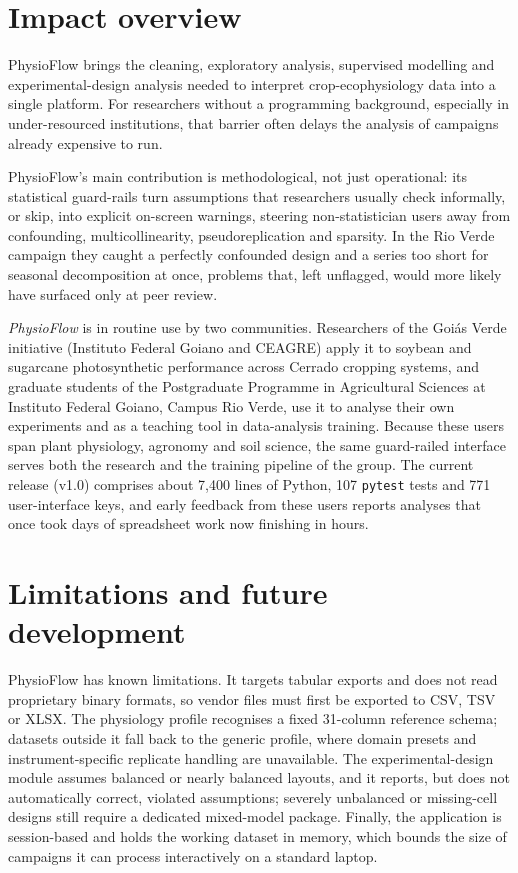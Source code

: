 \documentclass[11pt, letterpaper]{article}
\begin{document}
\section{Impact overview}\label{sec:impact}

PhysioFlow brings the cleaning, exploratory analysis, supervised modelling and experimental-design analysis needed to interpret crop-ecophysiology data into a single platform. For researchers without a programming background, especially in under-resourced institutions, that barrier often delays the analysis of campaigns already expensive to run.

PhysioFlow's main contribution is methodological, not just operational: its statistical guard-rails turn assumptions that researchers usually check informally, or skip, into explicit on-screen warnings, steering non-statistician users away from confounding, multicollinearity, pseudoreplication and sparsity. In the Rio Verde campaign they caught a perfectly confounded design and a series too short for seasonal decomposition at once, problems that, left unflagged, would more likely have surfaced only at peer review.

\emph{PhysioFlow} is in routine use by two communities. Researchers of the Goi\'as Verde initiative (Instituto Federal Goiano and CEAGRE) apply it to soybean and sugarcane photosynthetic performance across Cerrado cropping systems, and graduate students of the Postgraduate Programme in Agricultural Sciences at Instituto Federal Goiano, Campus Rio Verde, use it to analyse their own experiments and as a teaching tool in data-analysis training. Because these users span plant physiology, agronomy and soil science, the same guard-railed interface serves both the research and the training pipeline of the group. The current release (v1.0) comprises about 7{,}400 lines of Python, 107 \texttt{pytest} tests and 771 user-interface keys, and early feedback from these users reports analyses that once took days of spreadsheet work now finishing in hours.

\section{Limitations and future development}\label{sec:future}

PhysioFlow has known limitations. It targets tabular exports and does not read proprietary binary formats, so vendor files must first be exported to CSV, TSV or XLSX. The physiology profile recognises a fixed 31-column reference schema; datasets outside it fall back to the generic profile, where domain presets and instrument-specific replicate handling are unavailable. The experimental-design module assumes balanced or nearly balanced layouts, and it reports, but does not automatically correct, violated assumptions; severely unbalanced or missing-cell designs still require a dedicated mixed-model package. Finally, the application is session-based and holds the working dataset in memory, which bounds the size of campaigns it can process interactively on a standard laptop.
\end{document}
